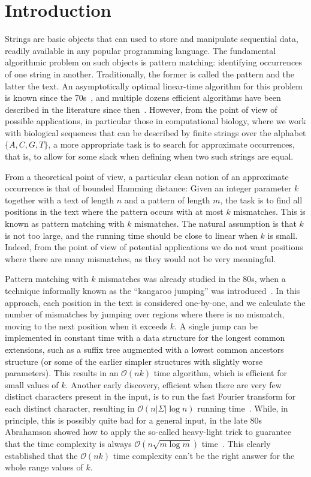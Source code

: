 \documentclass[11pt, letterpaper]{article}
\theoremstyle{plain}
\theoremstyle{definition}
\theoremstyle{remark}
\renewcommand{\O}{\mathcal{O}}
\begin{document}
\section{Introduction}
Strings are basic objects that can used to store and manipulate sequential data, readily available in any popular
programming language. The fundamental algorithmic problem on such objects is pattern matching: identifying occurrences of one string in another.
Traditionally, the former is called the pattern and the latter the text.
An asymptotically optimal linear-time algorithm for this problem is known since the 70s~\cite{Knuth1977}, and multiple dozens
efficient algorithms have been described in the literature since then~\cite{DBLP:books/daglib/0025563}. However, 
from the point of view of possible applications, in particular those in computational biology, where we work with biological sequences
that can be described by finite strings over the alphabet $\{A,C,G,T\}$, a more appropriate task is to search for approximate occurrences, that is, to 
allow for some slack when defining when two such strings are equal.

From a theoretical point of view, a particular clean notion of an approximate occurrence is that of bounded Hamming distance: Given an integer parameter $k$ together with a text of length $n$ and a pattern of length $m$, the task is to find all
positions in the text where the pattern occurs with at most $k$ mismatches. This is known as pattern matching with $k$
mismatches. The natural assumption is that $k$ is not too large,
and the running time should be close to linear when $k$ is small. Indeed, from the point of view of potential applications we do
not want positions where there are many mismatches, as they would not be very meaningful.

Pattern matching with $k$ mismatches was already studied in the 80s, when a technique informally known as
the ``kangaroo jumping'' was introduced~\cite{Landau1986,Galil1986}. In this approach,
each position in the text is considered one-by-one, and we calculate the number of mismatches
by jumping over regions where there is no mismatch, moving to the next position when it exceeds $k$.
A single jump can be implemented in constant time with a data structure for the longest common extensions, such
as a suffix tree augmented with a lowest common ancestors structure (or some of the earlier simpler structures with slightly worse
parameters). This results in an $\O(nk)$ time algorithm, which is efficient for small values of $k$.
Another early discovery, efficient when there are very few distinct characters present in the input,
is to run the fast Fourier transform for each distinct character, resulting in $\O(n|\Sigma|\log n)$ running time~\cite{FischerP74}.
While, in principle, this is possibly quite bad for a general input, in the late 80s Abrahamson showed
how to apply the so-called heavy-light trick to guarantee that the time complexity is always
$\O(n \sqrt{m \log m})$ time~\cite{Abrahamson1987}. This clearly established that the $\O(nk)$ time complexity
can't be the right answer for the whole range values of $k$.
\end{document}

